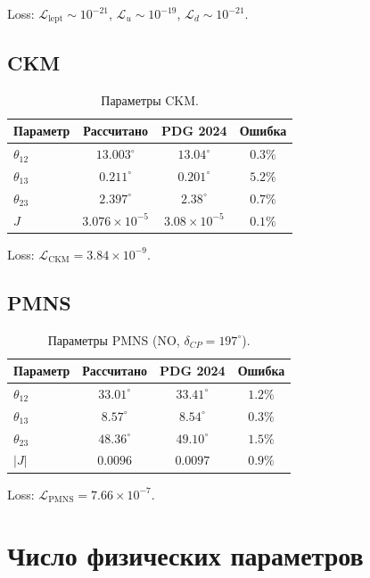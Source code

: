 \documentclass[11pt,a4paper]{article}
\numberwithin{equation}{section}
\begin{document}
Loss: $\mathcal{L}_{\text{lept}} \sim 10^{-21}$,
$\mathcal{L}_u \sim 10^{-19}$, $\mathcal{L}_d \sim 10^{-21}$.

\subsection{CKM}

\begin{table}[H]
\centering
\caption{Параметры CKM.}
\begin{tabular}{lccc}
\toprule
Параметр & Рассчитано & PDG 2024 & Ошибка \\
\midrule
$\theta_{12}$ & $13.003^\circ$ & $13.04^\circ$ & $0.3\%$ \\
$\theta_{13}$ & $0.211^\circ$  & $0.201^\circ$ & $5.2\%$ \\
$\theta_{23}$ & $2.397^\circ$  & $2.38^\circ$  & $0.7\%$ \\
$J$ & $3.076\times 10^{-5}$ & $3.08\times 10^{-5}$ & $0.1\%$ \\
\bottomrule
\end{tabular}
\end{table}

Loss: $\mathcal{L}_{\text{CKM}} = 3.84 \times 10^{-9}$.

\subsection{PMNS}

\begin{table}[H]
\centering
\caption{Параметры PMNS (NO, $\delta_{CP} = 197^\circ$).}
\begin{tabular}{lccc}
\toprule
Параметр & Рассчитано & PDG 2024 & Ошибка \\
\midrule
$\theta_{12}$ & $33.01^\circ$ & $33.41^\circ$ & $1.2\%$ \\
$\theta_{13}$ & $8.57^\circ$  & $8.54^\circ$  & $0.3\%$ \\
$\theta_{23}$ & $48.36^\circ$ & $49.10^\circ$ & $1.5\%$ \\
$|J|$         & $0.0096$ & $0.0097$ & $0.9\%$ \\
\bottomrule
\end{tabular}
\end{table}

Loss: $\mathcal{L}_{\text{PMNS}} = 7.66 \times 10^{-7}$.

\section{Число физических параметров}
\end{document}
